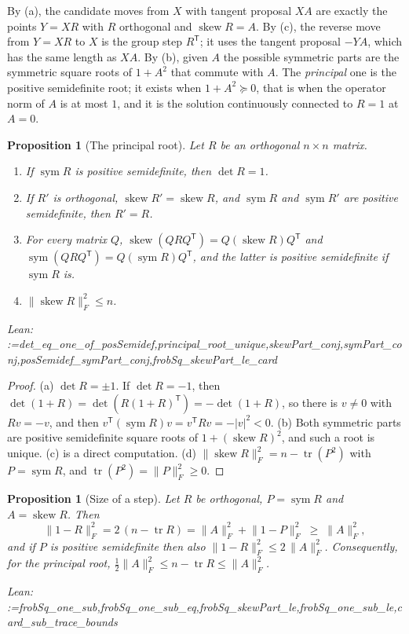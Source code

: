 \documentclass[11pt]{amsart}
\makeatletter
\newtheorem{proposition}[theorem]{Proposition}
\theoremstyle{definition}
\theoremstyle{remark}
\newcommand{\@leanlist}[1]{\def\@leansep{}\@for\@leanname:=#1\do{\@leansep
  \texttt{\expandafter\detokenize\expandafter{\@leanname}}\def\@leansep{, }}}
\newcommand{\lean}[1]{\par\smallskip\noindent
  {\footnotesize\normalfont\raggedright\textsf{Lean:} \@leanlist{#1}\par}}
\newcommand{\tr}{\operatorname{tr}}
\newcommand{\sym}{\operatorname{sym}}
\newcommand{\skw}{\operatorname{skew}}
\newcommand{\fro}[1]{\lVert #1\rVert_{F}}
\newcommand{\transp}{^{\mathsf T}}
\makeatother
\begin{document}
By (a), the candidate moves from $X$ with tangent proposal $XA$ are exactly the points $Y=XR$
with $R$ orthogonal and $\skw R=A$.  By (c), the reverse move from $Y=XR$ to $X$ is the group
step $R\transp$; it uses the tangent proposal $-YA$, which has the same length as $XA$.  By (b),
given $A$ the possible symmetric parts are the symmetric square roots of $1+A^2$ that
commute with $A$.  The \emph{principal} one is the positive semidefinite root; it exists when
$1+A^2\succeq0$, that is when the operator norm of $A$ is at most $1$, and it is the solution
continuously connected to $R=1$ at $A=0$.

\begin{proposition}[The principal root]\label{prop:principal}
Let $R$ be an orthogonal $n\times n$ matrix.
\begin{enumerate}
\item[(a)] If $\sym R$ is positive semidefinite, then $\det R=1$.
\item[(b)] If $R'$ is orthogonal, $\skw R'=\skw R$, and $\sym R$ and $\sym R'$ are positive
semidefinite, then $R'=R$.
\item[(c)] For every matrix $Q$, $\skw(QRQ\transp)=Q(\skw R)Q\transp$ and
$\sym(QRQ\transp)=Q(\sym R)Q\transp$, and the latter is positive semidefinite if $\sym R$ is.
\item[(d)] $\fro{\skw R}^2\le n$.
\end{enumerate}
\lean{det_eq_one_of_posSemidef,principal_root_unique,skewPart_conj,symPart_conj,posSemidef_symPart_conj,frobSq_skewPart_le_card}
\end{proposition}

\begin{proof}
(a) $\det R=\pm1$.  If $\det R=-1$, then
$\det(1+R)=\det(R(1+R)\transp)=-\det(1+R)$, so there is $v\ne0$ with $Rv=-v$, and then
$v\transp(\sym R)v=v\transp Rv=-|v|^2<0$.  (b) Both symmetric parts are positive semidefinite
square roots of $1+(\skw R)^2$, and such a root is unique.  (c) is a direct computation.  (d)
$\fro{\skw R}^2=n-\tr(P^2)$ with $P=\sym R$, and $\tr(P^2)=\fro{P}^2\ge0$.
\end{proof}

\begin{proposition}[Size of a step]\label{prop:step-size}
Let $R$ be orthogonal, $P=\sym R$ and $A=\skw R$.  Then
\[
  \fro{1-R}^2=2\,(n-\tr R)=\fro{A}^2+\fro{1-P}^2\;\ge\;\fro{A}^2,
\]
and if $P$ is positive semidefinite then also $\fro{1-R}^2\le2\,\fro{A}^2$.  Consequently, for
the principal root, $\tfrac12\fro{A}^2\le n-\tr R\le\fro{A}^2$.
\lean{frobSq_one_sub,frobSq_one_sub_eq,frobSq_skewPart_le,frobSq_one_sub_le,card_sub_trace_bounds}
\end{proposition}
\end{document}
